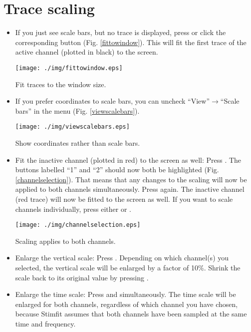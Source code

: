 \section{Trace scaling}
\begin{itemize}
  \item If you just see scale bars, but no trace is displayed, press  or click the corresponding button (Fig. \ref{fittowindow}). This will fit the first trace of the active channel (plotted in black) to the screen.
  \begin{myfigure}[htb]
    \begin{center}
      \texttt{[image: ./img/fittowindow.eps]}
    \end{center}
    \caption{Fit traces to the window size.}
    \label{fittowindow}
  \end{myfigure}
  \item If you prefer coordinates to scale bars, you can uncheck ``View''$\rightarrow$``Scale bars'' in the menu (Fig. \ref{viewscalebars}).
  \begin{myfigure}[ht]
    \begin{center}
      \texttt{[image: ./img/viewscalebars.eps]}
    \end{center}
    \caption{Show coordinates rather than scale bars.}
    \label{viewscalebars}
  \end{myfigure}
  \item Fit the inactive channel (plotted in red) to the screen as well: Press . The buttons labelled ``1'' and ``2'' should now both be highlighted (Fig. \ref{channelselection}). That means that any changes to the scaling will now be applied to both channels simultaneously. Press  again. The inactive channel (red trace) will now be fitted to the screen as well. If you want to scale channels individually, press either  or .
  \begin{myfigure}[ht]
    \begin{center}
      \texttt{[image: ./img/channelselection.eps]}
    \end{center}
    \caption{Scaling applies to both channels.}
    \label{channelselection}
  \end{myfigure}
  \item Enlarge the vertical scale: Press \keybox{+}. Depending on which channel(s) you selected, the vertical scale will be enlarged by a factor of 10\%. Shrink the scale back to its original value by pressing \keybox{-}.
  \item Enlarge the time scale: Press  and \keybox{+} simultaneously. The time scale will be enlarged for both channels, regardless of which channel you have chosen, because Stimfit assumes that both channels have been sampled at the same time and frequency.

\end{itemize}
